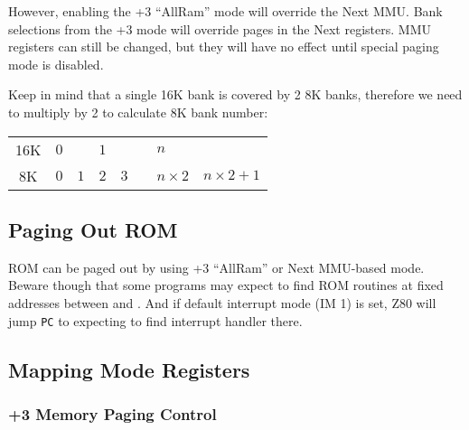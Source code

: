 However, enabling the +3 ``AllRam'' mode will override the Next MMU. Bank selections from the +3 mode will override pages in the Next registers. MMU registers can still be changed, but they will have no effect until special paging mode is disabled.

Keep in mind that a single 16K bank is covered by 2 8K banks, therefore we need to multiply by 2 to calculate 8K bank number:

{
	\def\arraystretch{1.5}
	\newcommand{\BankSize}[1]{#1}
	\newcommand{\BankNumber}[1]{#1}
	\begin{tabular}{|c|p{1cm}|p{1cm}|p{1cm}|p{1cm}|c|l|l|}
		\hline
		\BankSize{16K} & 
			\multicolumn{2}{l|}{\BankNumber{$0$}} & 
			\multicolumn{2}{l|}{\BankNumber{$1$}} & 
			\multirow{2}{*}{\ddd} & 
			\multicolumn{2}{l|}{\BankNumber{$n$}} \\
		\cline{1-5}
		\cline{7-8}
		\BankSize{8K} &
			\BankNumber{$0$} & 
			\BankNumber{$1$} & 
			\BankNumber{$2$} & 
			\BankNumber{$3$} &
			& 
			\BankNumber{$n \times 2$}  & 
			\BankNumber{$n \times 2 + 1$} \\
		\hline
	\end{tabular}
}

\subsection{Paging Out ROM}

ROM can be paged out by using +3 ``AllRam'' or Next MMU-based mode. Beware though that some programs may expect to find ROM routines at fixed addresses between  and . And if default interrupt mode (IM 1) is set, Z80 will jump {\tt PC} to  expecting to find interrupt handler there.


\pagebreak
\subsection{Mapping Mode Registers}
\label{zx_next_mappingregister}

\subsubsection{+3 Memory Paging Control }

\begin{NextPort}
\end{NextPort}

